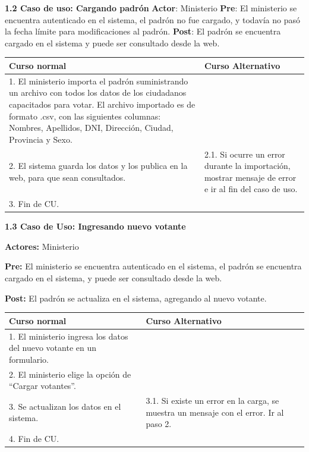 \textbf{1.2 Caso de uso: Cargando padrón}
\textbf{Actor}: Ministerio
\textbf{Pre}: El ministerio se encuentra autenticado en el sistema, el padrón no fue cargado, y todavía no pasó la fecha límite para modificaciones al padrón.
\textbf{Post}: El padrón se encuentra cargado en el sistema y puede ser consultado desde la web.
\begin{table}[h!]
	
 \begin{tabular}{|p{7.5cm} | p{7.5cm}|} 
 \hline
 \textbf{Curso normal} & \textbf{Curso Alternativo} \\
 \hline
1. El ministerio importa el padrón suministrando un archivo con todos los datos de los ciudadanos capacitados para votar.
El archivo importado es de formato .csv, con las siguientes columnas: Nombres, Apellidos, DNI, Dirección, Ciudad, Provincia y Sexo. & \\
\hline

2. El sistema guarda los datos y los publica en la web, para que sean consultados. &
2.1. Si ocurre un error durante la importación, mostrar mensaje de error e ir al fin del caso de uso. \\
\hline
3. Fin de CU. & \\

 \end{tabular}

\end{table}





\textbf{1.3 Caso de Uso: Ingresando nuevo votante}

\textbf{Actores:} Ministerio

\textbf{Pre:} El ministerio se encuentra autenticado en el sistema, el padrón se encuentra cargado en el sistema, y puede ser consultado desde la web.

\textbf{Post:} El padrón se actualiza en el sistema, agregando al nuevo votante.
\begin{table}[h!]
	
 \begin{tabular}{|p{7.5cm} | p{7.5cm}|} 
 \hline
 \textbf{Curso normal} & \textbf{Curso Alternativo} \\
 \hline

1. El ministerio ingresa los datos del nuevo votante en un formulario. & \\
\hline

2. El ministerio elige la opción de “Cargar votantes”. & \\
\hline

3. Se actualizan los datos en el sistema. & 3.1. Si existe un error en la carga, se muestra un mensaje con el error. Ir al paso 2. \\
\hline
4. Fin de CU. & \\
 \hline
 \end{tabular}

\end{table}

